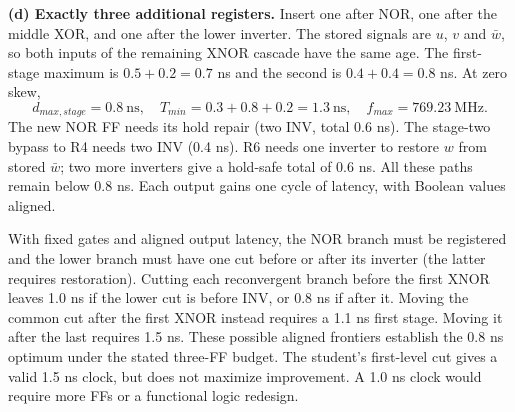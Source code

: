 \documentclass[10pt]{article}
\begin{document}
\textbf{(d) Exactly three additional registers.} Insert one after NOR, one after the middle XOR, and one after the lower inverter. The stored signals are $u$, $v$ and $\bar w$, so both inputs of the remaining XNOR cascade have the same age. The first-stage maximum is $0.5+0.2=0.7$ ns and the second is $0.4+0.4=0.8$ ns. At zero skew,
\[\boxed{d_{max,stage}=0.8\ \mathrm{ns},\quad T_{min}=0.3+0.8+0.2=1.3\ \mathrm{ns},\quad f_{max}=769.23\ \mathrm{MHz}.}\]
The new NOR FF needs its hold repair (two INV, total 0.6 ns). The stage-two bypass to R4 needs two INV (0.4 ns). R6 needs one inverter to restore $w$ from stored $\bar w$; two more inverters give a hold-safe total of 0.6 ns. All these paths remain below 0.8 ns. Each output gains one cycle of latency, with Boolean values aligned.
\begin{center}\end{center}
With fixed gates and aligned output latency, the NOR branch must be registered and the lower branch must have one cut before or after its inverter (the latter requires restoration). Cutting each reconvergent branch before the first XNOR leaves 1.0 ns if the lower cut is before INV, or 0.8 ns if after it. Moving the common cut after the first XNOR instead requires a 1.1 ns first stage. Moving it after the last requires 1.5 ns. These possible aligned frontiers establish the 0.8 ns optimum under the stated three-FF budget. The student's first-level cut gives a valid 1.5 ns clock, but does not maximize improvement. A 1.0 ns clock would require more FFs or a functional logic redesign.
\end{document}
